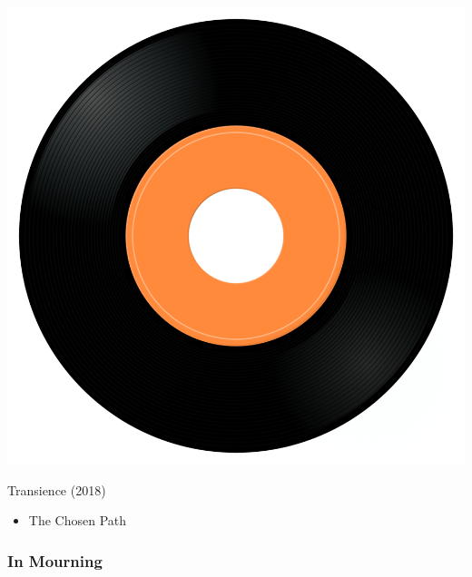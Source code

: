 \begin{minipage}[t]{0.25\textwidth}\vspace{0pt}
\captionsetup{type=figure}
\includegraphics[width=\textwidth]{Images/cover.png}
\caption*{Transience (2018)}
\end{minipage}
\begin{minipage}[t]{0.25\textwidth}\vspace{0pt}
\begin{itemize}[nosep,leftmargin=1em,labelwidth=*,align=left]
	\setlength{\itemsep}{0pt}
	\item The Chosen Path
\end{itemize}
\end{minipage}

\subsubsection{In Mourning}

